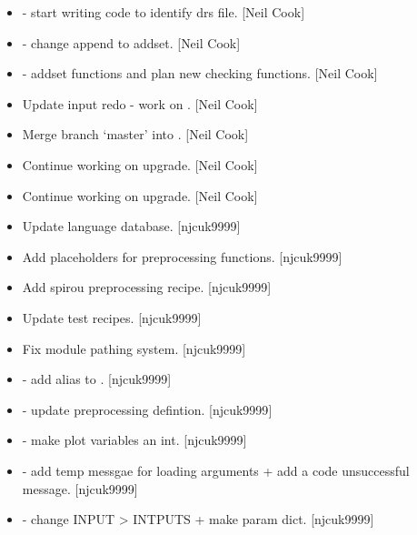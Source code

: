 \documentclass[a4paper,10pt,english]{report}
\begin{document}
\begin{itemize}
\item {} 
 - start writing code to identify drs file. {[}Neil
Cook{]}

\item {} 
 - change append to addset. {[}Neil Cook{]}

\item {} 
 - addset functions and plan new checking functions. {[}Neil
Cook{]}

\item {} 
Update input redo - work on . {[}Neil Cook{]}

\item {} 
Merge branch ‘master’ into . {[}Neil Cook{]}

\item {} 
Continue working on upgrade. {[}Neil Cook{]}

\item {} 
Continue working on upgrade. {[}Neil Cook{]}

\item {} 
Update language database. {[}njcuk9999{]}

\item {} 
Add placeholders for preprocessing functions. {[}njcuk9999{]}

\item {} 
Add spirou preprocessing recipe. {[}njcuk9999{]}

\item {} 
Update test recipes. {[}njcuk9999{]}

\item {} 
Fix module pathing system. {[}njcuk9999{]}

\item {} 
 - add alias to . {[}njcuk9999{]}

\item {} 
 - update preprocessing defintion. {[}njcuk9999{]}

\item {} 
 - make plot variables an int. {[}njcuk9999{]}

\item {} 
 - add temp messgae for loading arguments + add a code
unsuccessful message. {[}njcuk9999{]}

\item {} 
 - change INPUT \textendash{}\textgreater{} INTPUTS + make param dict.
{[}njcuk9999{]}


\end{itemize}
\end{document}
